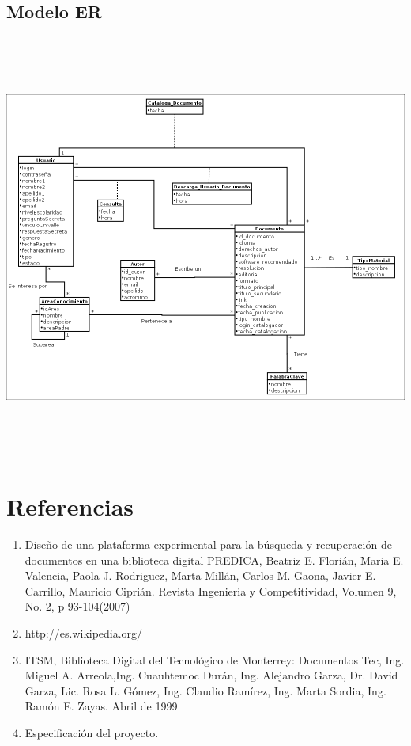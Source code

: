 \documentclass[]{article}
\begin{document}
		
		\subsection{Modelo ER} 
			\begin{minipage}[c]{1\linewidth}
                \centering
                \includegraphics[width=16cm, height=14cm]{ModeloDatos}
        	\end{minipage}
                        
\section{Referencias}
        \begin{enumerate}
                \item Diseño de una plataforma experimental para la búsqueda y recuperación de
                documentos en una biblioteca digital PREDICA, Beatriz E. Florián, Maria E.
                Valencia, Paola J. Rodriguez, Marta Millán, Carlos M. Gaona, Javier E. Carrillo,
                Mauricio Ciprián. Revista Ingenieria y Competitividad, Volumen 9, No. 2, p
                93-104(2007)
                
                \item http://es.wikipedia.org/
                
                \item ITSM, Biblioteca Digital del Tecnológico de Monterrey: Documentos Tec,
                Ing. Miguel A. Arreola,Ing. Cuauhtemoc Durán, Ing. Alejandro Garza,
                Dr. David Garza, Lic. Rosa L. Gómez, Ing. Claudio Ramírez, Ing. Marta Sordia,
                Ing. Ramón E. Zayas. Abril de 1999                
                
                \item Especificación del proyecto.
        \end{enumerate}                
                        
\end{document}

